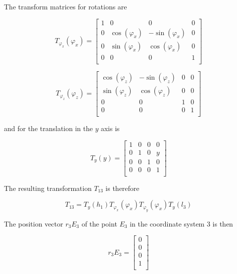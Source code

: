 \documentclass{article}
\begin{document}
The transform matrices for rotations are 

\begin{equation}
    T_{\varphi_x}({\varphi_x})=
    \left[
    \begin{array}{cccc}
        1  &0         &0        &0\\
        0  &\cos(\varphi_x)  &-\sin(\varphi_x) &0\\
        0  &\sin(\varphi_x)  &\cos(\varphi_x) &0\\
        0  &0         &0        &1\\
    \end{array}
    \right]
\end{equation}

\begin{equation}
    T_{\varphi_z}({\varphi_z})=
    \left[
    \begin{array}{cccc}
        \cos(\varphi_z)   &-\sin(\varphi_z)    &0  &0\\
        \sin(\varphi_z)   &\cos(\varphi_z)    &0  &0\\
        0          &0           &1  &0\\
        0          &0           &0  &1\\
    \end{array}
    \right]
\end{equation}

and for the translation in the $y$ axis is

\begin{equation}
    T_{y}(y)=
    \left[
    \begin{array}{cccc}
        1   &0    &0  &0\\
        0   &1    &0  &y\\
        0   &0    &1  &0\\
        0   &0    &0  &1\\
    \end{array}
    \right]
\end{equation}

The resulting transformation $T_{13}$ is therefore

\begin{equation}
    T_{13} = T_{y}(h_1) T_{\varphi_x}(\varphi_x) T_{\varphi_y}(\varphi_x) T_{y}(l_3)
\end{equation}

The position vector $r_3{E_3}$ of the point $E_3$ in the coordinate system 3 is then

\begin{equation}
    r_3{E_3}=
    \left[
    \begin{array}{c}
        0\\
        0\\
        0\\
        1\\
    \end{array}
    \right]
\end{equation}
\end{document}
